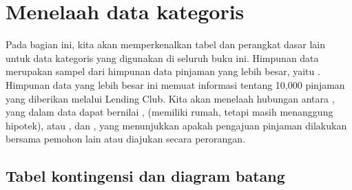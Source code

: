 \FloatBarrier



{}




\section{Menelaah data kategoris}
\label{categoricalData}


Pada bagian ini, kita akan memperkenalkan tabel dan perangkat dasar lain
untuk data kategoris yang digunakan di seluruh buku ini.
Himpunan data  merupakan sampel dari himpunan data pinjaman
yang lebih besar, yaitu .
Himpunan data yang lebih besar ini memuat informasi tentang 10,000 pinjaman
yang diberikan melalui Lending Club.
Kita akan menelaah hubungan antara
, yang dalam data  dapat bernilai
, 
(memiliki rumah, tetapi masih menanggung hipotek), atau ,
dan ,
yang menunjukkan apakah pengajuan pinjaman dilakukan
bersama pemohon lain atau diajukan secara perorangan.


\subsection{Tabel kontingensi dan diagram batang}

\newcommand{\loanapphomeAA}{3496}
\newcommand{\loanapphomeAB}{3839}
\newcommand{\loanapphomeAC}{1170}
\newcommand{\loanapphomeAD}{8505}
\newcommand{\loanapphomeBA}{362}
\newcommand{\loanapphomeBB}{950}
\newcommand{\loanapphomeBC}{183}
\newcommand{\loanapphomeBD}{1495}
\newcommand{\loanapphomeDA}{3858}
\newcommand{\loanapphomeDAPt}{0.3858} %
\newcommand{\loanapphomeDB}{4789}
\newcommand{\loanapphomeDC}{1353}
\newcommand{\loanapphomeDD}{10000}
\newcommand{\loanapphomeN}{\loanapphomeDD{}}

